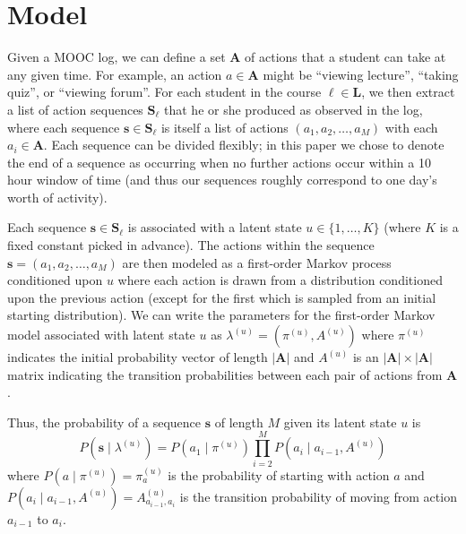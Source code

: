 \section{Model}

Given a MOOC log, we can define a set $\mathbf{A}$ of actions that a
student can take at any given time. For example, an action $a \in
\mathbf{A}$ might be ``viewing lecture'', ``taking quiz'', or ``viewing
forum''. For each student in the course $\ell \in \mathbf{L}$, we then
extract a list of action sequences $\mathbf{S}_\ell$ that he or she
produced as observed in the log, where each sequence $\mathbf{s} \in
\mathbf{S}_\ell$ is itself a list of actions $(a_1, a_2, \ldots, a_M)$ with
each $a_i \in \mathbf{A}$.  Each sequence can be divided flexibly; in this
paper we chose to denote the end of a sequence as occurring when no further
actions occur within a 10 hour window of time (and thus our sequences
roughly correspond to one day's worth of activity).

Each sequence $\mathbf{s} \in \mathbf{S}_\ell$ is associated with a latent
state $u \in \{1,\ldots,K\}$ (where $K$ is a fixed constant picked in
advance). The actions within the sequence $\mathbf{s} = (a_1, a_2, \ldots,
a_M)$ are then modeled as a first-order Markov process conditioned upon $u$
where each action is drawn from a distribution conditioned upon the
previous action (except for the first which is sampled from an initial
starting distribution). We can write the parameters for the first-order
Markov model associated with latent state $u$ as $\lambda^{(u)} =
(\pi^{(u)}, A^{(u)})$ where $\pi^{(u)}$ indicates the initial probability
vector of length $|\mathbf{A}|$ and $A^{(u)}$ is an $|\mathbf{A}| \times
|\mathbf{A}|$ matrix indicating the transition probabilities between each
pair of actions from $\mathbf{A}$.

Thus, the probability of a sequence $\mathbf{s}$ of length $M$ given its
latent state $u$ is
\begin{equation}
  P(\mathbf{s} \mid \lambda^{(u)}) = P(a_1 \mid \pi^{(u)}) \prod_{i=2}^M P(a_i \mid
  a_{i-1}, A^{(u)})
\end{equation}
where $P(a \mid \pi^{(u)}) = \pi^{(u)}_a$ is the probability of starting
with action $a$ and $P(a_i \mid a_{i-1}, A^{(u)}) = A^{(u)}_{a_{i-1}, a_i}$
is the transition probability of moving from action $a_{i-1}$ to $a_{i}$.

